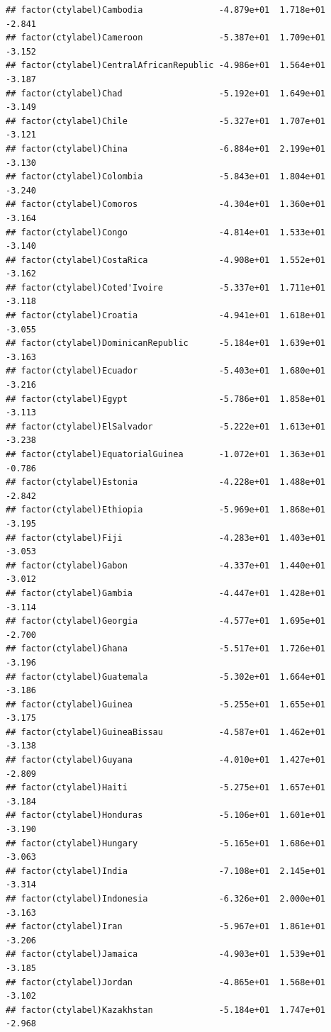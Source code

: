\documentclass[12pt]{article}\usepackage[]{graphicx}\usepackage[]{color}
\makeatletter
\newenvironment{kframe}{%
 \def\at@end@of@kframe{}%
 \ifinner\ifhmode%
  \def\at@end@of@kframe{\end{minipage}}%
  \begin{minipage}{\columnwidth}%
 \fi\fi%
 \def\FrameCommand##1{\hskip\@totalleftmargin \hskip-\fboxsep
 \colorbox{shadecolor}{##1}\hskip-\fboxsep
     \hskip-\linewidth \hskip-\@totalleftmargin \hskip\columnwidth}%
 \MakeFramed {\advance\hsize-\width
   \@totalleftmargin\z@ \linewidth\hsize
   \@setminipage}}%
 {\par\unskip\endMakeFramed%
 \at@end@of@kframe}
\newenvironment{knitrout}{}{} %
\makeatother
\begin{document}
\begin{knitrout}
\begin{kframe}
\begin{verbatim}
## factor(ctylabel)Cambodia               -4.879e+01  1.718e+01  -2.841
## factor(ctylabel)Cameroon               -5.387e+01  1.709e+01  -3.152
## factor(ctylabel)CentralAfricanRepublic -4.986e+01  1.564e+01  -3.187
## factor(ctylabel)Chad                   -5.192e+01  1.649e+01  -3.149
## factor(ctylabel)Chile                  -5.327e+01  1.707e+01  -3.121
## factor(ctylabel)China                  -6.884e+01  2.199e+01  -3.130
## factor(ctylabel)Colombia               -5.843e+01  1.804e+01  -3.240
## factor(ctylabel)Comoros                -4.304e+01  1.360e+01  -3.164
## factor(ctylabel)Congo                  -4.814e+01  1.533e+01  -3.140
## factor(ctylabel)CostaRica              -4.908e+01  1.552e+01  -3.162
## factor(ctylabel)Coted'Ivoire           -5.337e+01  1.711e+01  -3.118
## factor(ctylabel)Croatia                -4.941e+01  1.618e+01  -3.055
## factor(ctylabel)DominicanRepublic      -5.184e+01  1.639e+01  -3.163
## factor(ctylabel)Ecuador                -5.403e+01  1.680e+01  -3.216
## factor(ctylabel)Egypt                  -5.786e+01  1.858e+01  -3.113
## factor(ctylabel)ElSalvador             -5.222e+01  1.613e+01  -3.238
## factor(ctylabel)EquatorialGuinea       -1.072e+01  1.363e+01  -0.786
## factor(ctylabel)Estonia                -4.228e+01  1.488e+01  -2.842
## factor(ctylabel)Ethiopia               -5.969e+01  1.868e+01  -3.195
## factor(ctylabel)Fiji                   -4.283e+01  1.403e+01  -3.053
## factor(ctylabel)Gabon                  -4.337e+01  1.440e+01  -3.012
## factor(ctylabel)Gambia                 -4.447e+01  1.428e+01  -3.114
## factor(ctylabel)Georgia                -4.577e+01  1.695e+01  -2.700
## factor(ctylabel)Ghana                  -5.517e+01  1.726e+01  -3.196
## factor(ctylabel)Guatemala              -5.302e+01  1.664e+01  -3.186
## factor(ctylabel)Guinea                 -5.255e+01  1.655e+01  -3.175
## factor(ctylabel)GuineaBissau           -4.587e+01  1.462e+01  -3.138
## factor(ctylabel)Guyana                 -4.010e+01  1.427e+01  -2.809
## factor(ctylabel)Haiti                  -5.275e+01  1.657e+01  -3.184
## factor(ctylabel)Honduras               -5.106e+01  1.601e+01  -3.190
## factor(ctylabel)Hungary                -5.165e+01  1.686e+01  -3.063
## factor(ctylabel)India                  -7.108e+01  2.145e+01  -3.314
## factor(ctylabel)Indonesia              -6.326e+01  2.000e+01  -3.163
## factor(ctylabel)Iran                   -5.967e+01  1.861e+01  -3.206
## factor(ctylabel)Jamaica                -4.903e+01  1.539e+01  -3.185
## factor(ctylabel)Jordan                 -4.865e+01  1.568e+01  -3.102
## factor(ctylabel)Kazakhstan             -5.184e+01  1.747e+01  -2.968

\end{verbatim}
\end{kframe}
\end{knitrout}
\end{document}
